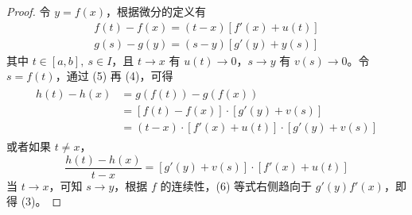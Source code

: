\documentclass[../poma-notes.tex]{subfiles}
\begin{document}
\begin{proof}
  令 $y = f(x)$，根据微分的定义有
  \begin{align}
    f(t) - f(x) = (t - x)[f'(x) + u(t)] \\
    g(s) - g(y) = (s - y)[g'(y) + y(s)]
  \end{align}
  其中 $t \in [a,b],\ s \in I$，且 $t \to x$ 有 $u(t) \to 0$，$s \to y$ 有 $v(s) \to 0$。令 $s = f(t)$，通过 (5)
  再 (4)，可得
  \begin{align*}
    \begin{split}
      h(t) - h(x) & = g(f(t)) - g(f(x)) \\
      & = [f(t) - f(x)] \cdot [g'(y) + v(s)] \\
      & = (t - x) \cdot [f'(x) + u(t)] \cdot [g'(y) + v(s)]
    \end{split}
  \end{align*}
  或者如果 $t \ne x$，
  \begin{equation}
    \frac{h(t) - h(x)}{t - x} = [g'(y) + v(s)] \cdot [f'(x) + u(t)]
  \end{equation}
  当 $t \to x$，可知 $s \to y$，根据 $f$ 的连续性，(6) 等式右侧趋向于 $g'(y) f'(x)$，即得 (3)。
\end{proof}
\end{document}
